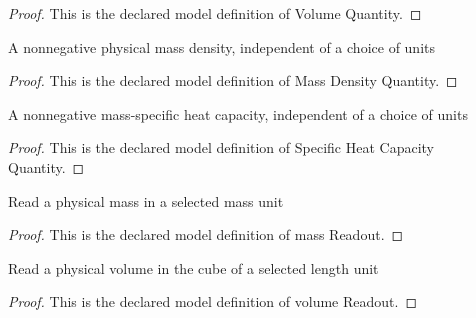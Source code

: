 \begin{proof}
  This is the declared model definition of Volume Quantity.
\end{proof}
\begin{definition}
  \label{def:physics:phyx-mini-0485:phyxminiproblems-problemphyxmini0485-massdensityquantity}
  A nonnegative physical mass density, independent of a choice of units
\end{definition}
\begin{proof}
  This is the declared model definition of Mass Density Quantity.
\end{proof}
\begin{definition}
  \label{def:physics:phyx-mini-0485:phyxminiproblems-problemphyxmini0485-specificheatcapacityquantity}
  A nonnegative mass-specific heat capacity, independent of a choice of units
\end{definition}
\begin{proof}
  This is the declared model definition of Specific Heat Capacity Quantity.
\end{proof}
\begin{definition}
  \label{def:physics:phyx-mini-0485:phyxminiproblems-problemphyxmini0485-massreadout}
  Read a physical mass in a selected mass unit
\end{definition}
\begin{proof}
  This is the declared model definition of mass Readout.
\end{proof}
\begin{definition}
  \label{def:physics:phyx-mini-0485:phyxminiproblems-problemphyxmini0485-volumereadout}
  Read a physical volume in the cube of a selected length unit
\end{definition}
\begin{proof}
  This is the declared model definition of volume Readout.
\end{proof}
